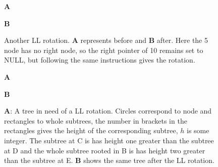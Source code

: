 \documentclass[11pt,a4paper]{scrartcl}
\begin{document}
\begin{figure}
{\bf A}
\begin{center}
\end{center}
{\bf B}
\begin{center}
\end{center}
\caption{Another LL rotation. {\bf A} represents before and {\bf B}
  after. Here the 5 node has no right node, so the right pointer of 10
  remains set to NULL, but following the same instructions gives the rotation.\label{fig_LL_simple}}
\end{figure}

\begin{figure}
{\bf A}
\begin{center}
\end{center}
{\bf B}
\begin{center}
\end{center}
\caption{{\bf A}: A tree in need of a LL rotation. Circles correspond
  to node and rectangles to whole subtrees, the number in brackets in
  the rectangles gives the height of the corresponding subtree, $h$ is
  some integer. The subtree at C is has height one greater than the
  subtree at D and the whole subtree rooted in B is has height two
  greater than the subtree at E. {\bf B} shows the same tree after the
  LL rotation.\label{fig_LL_complicated}}
\end{figure}
\end{document}
